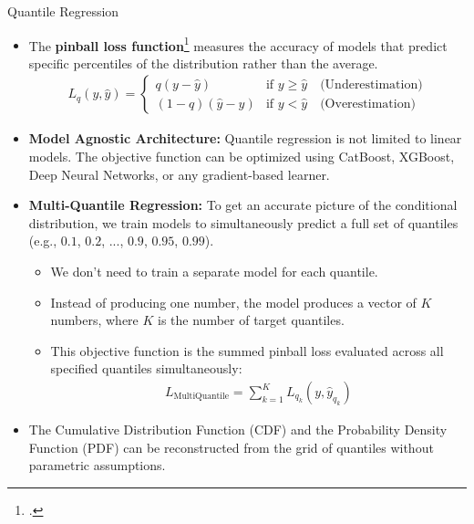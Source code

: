 \documentclass[11pt]{beamer}
\begin{document}
\begin{frame}[allowframebreaks]{Quantile Regression}
\begin{small}
\begin{itemize}
\item The \textbf{pinball loss function}\footcite[First proposed by][]{koenker1978} measures the accuracy of models that predict specific percentiles of the distribution rather than the average.
\begin{align*}
L_{q}(y,\hat{y})=\begin{cases}q(y-\hat{y})&\text{if\ }y\ge \hat{y}\quad \text{(Underestimation)}\\ (1-q)(\hat{y}-y)&\text{if\ }y<\hat{y}\quad \text{(Overestimation)}\end{cases}
\end{align*}

\item \textbf{Model Agnostic Architecture:} Quantile regression is not limited to linear models. The objective function can be optimized using CatBoost, XGBoost, Deep Neural Networks, or any gradient-based learner.

\item \textbf{Multi-Quantile Regression:} To get an accurate picture of the conditional distribution, we train models to simultaneously predict a full set of quantiles (e.g., $0.1$, $0.2$, ..., $0.9$, $0.95$, $0.99$).
\begin{itemize}
\item We don't need to train a separate model for each quantile.
\item Instead of producing one number, the model produces a vector of $K$ numbers, where $K$ is the number of target quantiles.
\item This objective function is the summed pinball loss evaluated across all specified quantiles simultaneously:
\begin{align*}
L_{\text{MultiQuantile}}=\sum _{k=1}^{K} L_{q_{k}} (y,\hat{y}_{q_{k}})
\end{align*}
\end{itemize}

\item The Cumulative Distribution Function (CDF) and the Probability Density Function (PDF) can be reconstructed from the grid of quantiles without parametric assumptions.
\end{itemize}
\end{small}
\end{frame}
\end{document}
